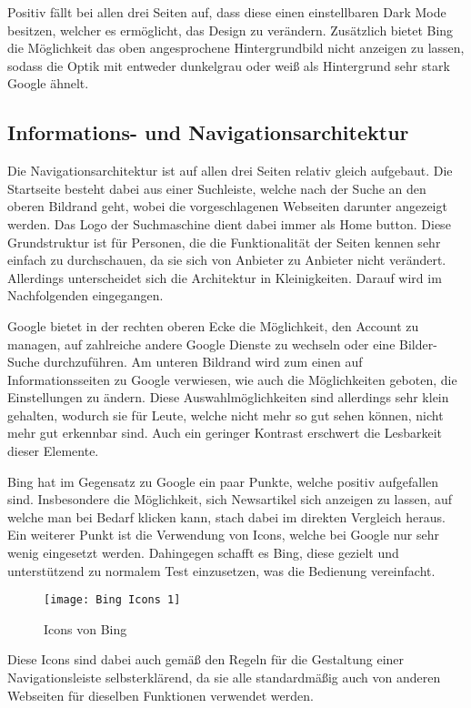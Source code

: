 Positiv fällt bei allen drei Seiten auf, dass diese einen einstellbaren Dark Mode besitzen, welcher es ermöglicht, das Design zu verändern.
Zusätzlich bietet Bing die Möglichkeit das oben angesprochene Hintergrundbild nicht anzeigen zu lassen,
sodass die Optik mit entweder dunkelgrau oder weiß als Hintergrund sehr stark Google ähnelt.

\subsection{Informations- und Navigationsarchitektur}\label{subsec:informations--und-navigationsarchitektur}
Die Navigationsarchitektur ist auf allen drei Seiten relativ gleich aufgebaut.
Die Startseite besteht dabei aus einer Suchleiste,
welche nach der Suche an den oberen Bildrand geht, wobei die vorgeschlagenen Webseiten darunter angezeigt werden.
Das Logo der Suchmaschine dient dabei immer als Home button.
Diese Grundstruktur ist für Personen, die die Funktionalität der
Seiten kennen sehr einfach zu durchschauen, da sie sich von Anbieter zu Anbieter nicht verändert.
Allerdings unterscheidet sich die Architektur in Kleinigkeiten.
Darauf wird im Nachfolgenden eingegangen.

Google bietet in der rechten oberen Ecke die Möglichkeit, den Account zu managen, auf zahlreiche andere Google Dienste zu
wechseln oder eine Bilder-Suche durchzuführen.
Am unteren Bildrand wird zum einen auf Informationsseiten zu Google verwiesen,
wie auch die Möglichkeiten geboten, die Einstellungen zu ändern.
Diese Auswahlmöglichkeiten sind allerdings sehr klein gehalten,
wodurch sie für Leute, welche nicht mehr so gut sehen können, nicht mehr gut erkennbar sind.
Auch ein geringer Kontrast erschwert die Lesbarkeit dieser Elemente.

Bing hat im Gegensatz zu Google ein paar Punkte, welche positiv aufgefallen sind.
Insbesondere die Möglichkeit, sich Newsartikel sich anzeigen zu lassen,
auf welche man bei Bedarf klicken kann, stach dabei im direkten Vergleich heraus.
Ein weiterer Punkt ist die Verwendung von Icons, welche bei Google nur sehr wenig eingesetzt werden.
Dahingegen schafft es Bing, diese gezielt und unterstützend zu normalem Test einzusetzen, was die Bedienung vereinfacht.
\begin{figure}[ht]
    \centering
    \texttt{[image: Bing Icons 1]}
    \caption{Icons von Bing}\label{fig:figure8}
\end{figure}
Diese Icons sind dabei auch gemäß den Regeln
für die Gestaltung einer Navigationsleiste\autocite[Seite 17]{Maulhardt6} selbsterklärend, da sie alle standardmäßig auch von
anderen Webseiten für dieselben Funktionen verwendet werden.

